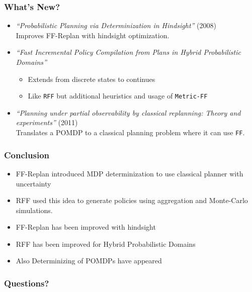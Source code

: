 \documentclass{beamer}
\let\origframetitle=\frametitle
\renewcommand\frametitle[1]{\origframetitle{\textbf{\large{\textrm{#1}}}}}
\begin{document}
\begin{frame}
  \frametitle{What's New?}

  \begin{itemize}
    \item \emph{``Probabilistic Planning via Determinization in Hindsight''} (2008) \\
      Improves FF-Replan with hindsight optimization.
    \item \emph{``Fast Incremental Policy Compilation from Plans in Hybrid Probabilistic Domains''}
      \begin{itemize}
        \item Extends from discrete states to continues
        \item Like \texttt{RFF} but additional heuristics and usage of \texttt{Metric-FF}
      \end{itemize}
    \item \emph{``Planning under partial observability by classical replanning: Theory and experiments''} (2011) \\
      Translates a POMDP to a classical planning problem where it can use \texttt{FF}.
  \end{itemize}

\end{frame}

\begin{frame}
  \frametitle{Conclusion}

  \begin{itemize}
    \item FF-Replan introduced MDP determinization to use classical planner with uncertainty
    \item RFF used this idea to generate policies using aggregation and Monte-Carlo simulations.
    \item FF-Replan has been improved with hindsight
    \item RFF has been improved for Hybrid Probabilistic Domains
    \item Also Determinizing of POMDPs have appeared
  \end{itemize}

\end{frame}


\begin{frame}
  \frametitle{Questions?}
\end{frame}
\end{document}
